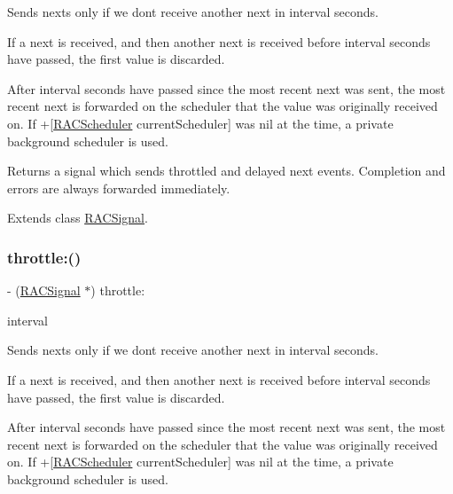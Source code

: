 Sends {\ttfamily next}s only if we don\textquotesingle{}t receive another {\ttfamily next} in {\ttfamily interval} seconds.

If a {\ttfamily next} is received, and then another {\ttfamily next} is received before {\ttfamily interval} seconds have passed, the first value is discarded.

After {\ttfamily interval} seconds have passed since the most recent {\ttfamily next} was sent, the most recent {\ttfamily next} is forwarded on the scheduler that the value was originally received on. If +\mbox{[}\mbox{\hyperlink{interface_r_a_c_scheduler}{R\+A\+C\+Scheduler}} current\+Scheduler\mbox{]} was nil at the time, a private background scheduler is used.

Returns a signal which sends throttled and delayed {\ttfamily next} events. Completion and errors are always forwarded immediately. 

Extends class \mbox{\hyperlink{interface_r_a_c_signal_a2542ae804d05ec734d0f4d2fa8c3ac93}{R\+A\+C\+Signal}}.

\mbox{\label{category_r_a_c_signal_07_operations_08_a2542ae804d05ec734d0f4d2fa8c3ac93}} 
\subsubsection{\texorpdfstring{throttle\+:()}{throttle:()}\hspace{0.1cm}{\footnotesize\ttfamily [3/3]}}
{\footnotesize\ttfamily -\/ (\mbox{\hyperlink{interface_r_a_c_signal}{R\+A\+C\+Signal}} $\ast$) throttle\+: \begin{DoxyParamCaption}\item[{(N\+S\+Time\+Interval)}]{interval }\end{DoxyParamCaption}}

Sends {\ttfamily next}s only if we don\textquotesingle{}t receive another {\ttfamily next} in {\ttfamily interval} seconds.

If a {\ttfamily next} is received, and then another {\ttfamily next} is received before {\ttfamily interval} seconds have passed, the first value is discarded.

After {\ttfamily interval} seconds have passed since the most recent {\ttfamily next} was sent, the most recent {\ttfamily next} is forwarded on the scheduler that the value was originally received on. If +\mbox{[}\mbox{\hyperlink{interface_r_a_c_scheduler}{R\+A\+C\+Scheduler}} current\+Scheduler\mbox{]} was nil at the time, a private background scheduler is used.

